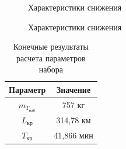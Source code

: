 \begin{figure}[H]
    \caption{Характеристики снижения}
    \label{fig:Характеристики Спуска1}
\end{figure}

\begin{figure}[H]
    \caption{Характеристики снижения}
    \label{fig:Характеристики Спуска2}
\end{figure}

\begin{table}[H]
    \centering
    \caption{Конечные результаты расчета параметров набора}
    \begin{tabular}{|c|c|}
    \hline
        Параметр & Значение \\ \hline
        $m_{T_\text{наб}}$ & 757 кг\\ \hline
        $L_\text{кр}$ & 314,78 км\\ \hline
        $T_\text{кр}$ & 41,866 мин\\ \hline
    \end{tabular}
    \label{tab:Крейсер}
\end{table}

